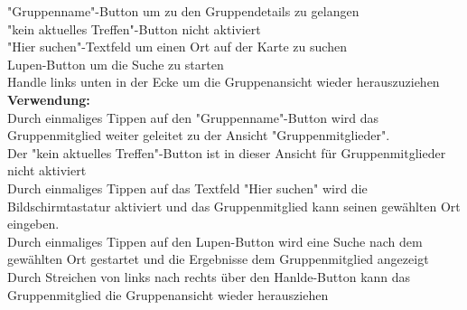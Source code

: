 "Gruppenname"-Button um zu den Gruppendetails zu gelangen\\
"kein aktuelles Treffen"-Button nicht aktiviert\\
"Hier suchen"-Textfeld um einen Ort auf der Karte zu suchen\\
Lupen-Button um die Suche zu starten\\
Handle links unten in der Ecke um die Gruppenansicht wieder herauszuziehen\\
\textbf{Verwendung:}\\
Durch einmaliges Tippen auf den "Gruppenname"-Button wird das Gruppenmitglied weiter geleitet zu der Ansicht "Gruppenmitglieder".\\
Der "kein aktuelles Treffen"-Button ist in dieser Ansicht für Gruppenmitglieder nicht aktiviert\\
Durch einmaliges Tippen auf das Textfeld "Hier suchen" wird die Bildschirmtastatur aktiviert und das Gruppenmitglied kann seinen gewählten Ort eingeben.\\
Durch einmaliges Tippen auf den Lupen-Button wird eine Suche nach dem gewählten Ort gestartet und die Ergebnisse dem Gruppenmitglied angezeigt\\
Durch Streichen von links nach rechts über den Hanlde-Button kann das Gruppenmitglied die Gruppenansicht wieder herausziehen\\ \\

